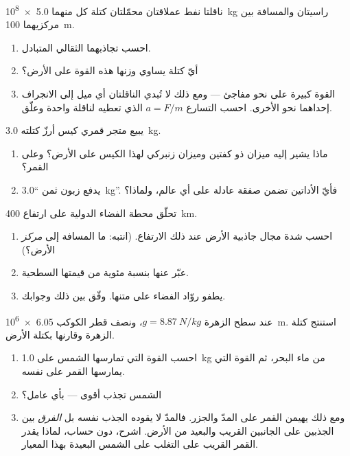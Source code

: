 \begin{exercise}[$\star\star$]\label{exo:g10:universal-gravitation:6}
ناقلتا نفط عملاقتان محمّلتان كتلة كل منهما \qty{5.0e8}{kg} راسيتان والمسافة بين
مركزيهما \qty{100}{m}.
\begin{enumerate}
  \item احسب تجاذبهما الثقالي المتبادل.
  \item أيّ كتلة يساوي وزنها هذه القوة على الأرض؟
  \item القوة كبيرة على نحو مفاجئ --- ومع ذلك لا تُبدي الناقلتان أي
        ميل إلى الانجراف إحداهما نحو الأخرى. احسب التسارع
        $a = F/m$ الذي تعطيه لناقلة واحدة وعلّق.
\end{enumerate}
\end{exercise}

\begin{exercise}[$\star\star$]\label{exo:g10:universal-gravitation:7}
يبيع متجر قمري كيس أرزّ كتلته \qty{3.0}{kg}.
\begin{enumerate}
  \item ماذا يشير إليه ميزان ذو كفتين وميزان زنبركي لهذا الكيس
        على الأرض؟ وعلى القمر؟
  \item يدفع زبون ثمن ``\qty{3.0}{kg}''. فأيّ الأداتين
        تضمن صفقة عادلة على أي عالم، ولماذا؟
\end{enumerate}
\end{exercise}

\begin{exercise}[$\star\star$]\label{exo:g10:universal-gravitation:8}
تحلّق محطة الفضاء الدولية على ارتفاع \qty{400}{km}.
\begin{enumerate}
  \item احسب شدة مجال جاذبية الأرض عند ذلك
        الارتفاع. (انتبه: ما المسافة إلى \emph{مركز}
        الأرض؟)
  \item عبّر عنها بنسبة مئوية من قيمتها السطحية.
  \item يطفو روّاد الفضاء على متنها. وفّق بين ذلك وجوابك.
\end{enumerate}
\end{exercise}

\begin{exercise}[$\star\star$]\label{exo:g10:universal-gravitation:9}
عند سطح الزهرة $g = \qty{8.87}{N/kg}$، ونصف قطر الكوكب
\qty{6.05e6}{m}. استنتج كتلة الزهرة وقارنها بكتلة
الأرض.
\end{exercise}

\begin{exercise}[$\star\star$]\label{exo:g10:universal-gravitation:10}
\begin{enumerate}
  \item احسب القوة التي تمارسها الشمس على \qty{1.0}{kg} من ماء
        البحر، ثم القوة التي يمارسها القمر على 
        نفسه.
  \item الشمس تجذب أقوى --- بأي عامل؟
  \item ومع ذلك يهيمن القمر على المدّ والجزر. فالمدّ لا يقوده
        الجذب نفسه بل \emph{الفرق} بين الجذبين على
        الجانبين القريب والبعيد من الأرض. اشرح، دون
        حساب، لماذا يقدر القمر القريب على التغلب على الشمس البعيدة
        بهذا المعيار.
\end{enumerate}
\end{exercise}


